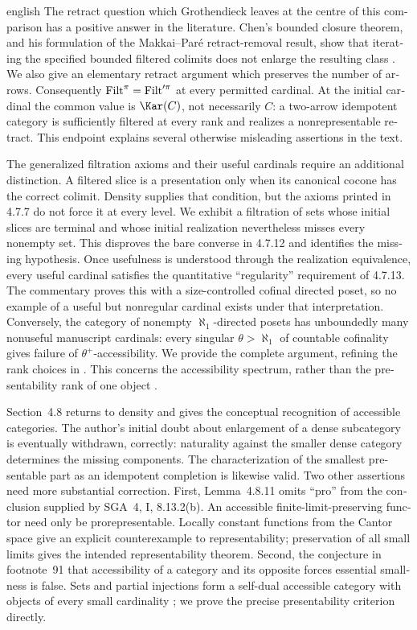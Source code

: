 \begin{otherlanguage}{english}
\begin{otherlanguage*}{english}
The retract question which Grothendieck leaves at the centre of this comparison has a positive answer in the literature. Chen's bounded closure theorem, and his formulation of the Makkai--Par\'e retract-removal result, show that iterating the specified bounded filtered colimits does not enlarge the resulting class \citep[Corollaries~4.13 and~4.15]{Chen2021Sifted}. We also give an elementary retract argument which preserves the number of arrows. Consequently $\mathrm{Filt}^\pi=\mathrm{Filt}'^\pi$ at every permitted cardinal. At the initial cardinal the common value is $\Kar(C)$, not necessarily $C$: a two-arrow idempotent category is sufficiently filtered at every rank and realizes a nonrepresentable retract. This endpoint explains several otherwise misleading assertions in the text.

The generalized filtration axioms and their useful cardinals require an additional distinction. A filtered slice is a presentation only when its canonical cocone has the correct colimit. Density supplies that condition, but the axioms printed in 4.7.7 do not force it at every level. We exhibit a filtration of sets whose initial slices are terminal and whose initial realization nevertheless misses every nonempty set. This disproves the bare converse in 4.7.12 and identifies the missing hypothesis. Once usefulness is understood through the realization equivalence, every useful cardinal satisfies the quantitative ``regularity'' requirement of 4.7.13. The commentary proves this with a size-controlled cofinal directed poset, so no example of a useful but nonregular cardinal exists under that interpretation. Conversely, the category of nonempty $\aleph_1$-directed posets has unboundedly many nonuseful manuscript cardinals: every singular $\theta>\aleph_1$ of countable cofinality gives failure of $\theta^+$-accessibility. We provide the complete argument, refining the rank choices in \citet[Example~3.8]{Vasey2020Accessible}. This concerns the accessibility spectrum, rather than the presentability rank of one object \citep{LiebermanRosickyVasey2019Sizes}.

Section~4.8 returns to density and gives the conceptual recognition of accessible categories. The author's initial doubt about enlargement of a dense subcategory is eventually withdrawn, correctly: naturality against the smaller dense category determines the missing components. The characterization of the smallest presentable part as an idempotent completion is likewise valid. Two other assertions need more substantial correction. First, Lemma~4.8.11 omits ``pro'' from the conclusion supplied by SGA~4, I, 8.13.2(b). An accessible finite-limit-preserving functor need only be prorepresentable. Locally constant functions from the Cantor space give an explicit counterexample to representability; preservation of all small limits gives the intended representability theorem. Second, the conjecture in footnote~91 that accessibility of a category and its opposite forces essential smallness is false. Sets and partial injections form a self-dual accessible category with objects of every small cardinality \citep[\S3.2]{Heunen2013L2}; we prove the precise presentability criterion directly.


\end{otherlanguage*}
\end{otherlanguage}
